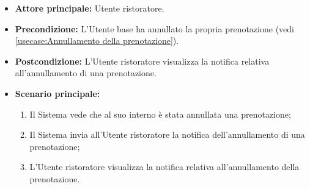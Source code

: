 \label{usecase:Visualizzazione notifica annullamento prenotazione}
\begin{itemize}
	\item \textbf{Attore principale:} Utente ristoratore.

	\item \textbf{Precondizione:} L'Utente base ha annullato la propria prenotazione (vedi \autoref{usecase:Annullamento della prenotazione}).

	\item \textbf{Postcondizione:} L'Utente ristoratore visualizza la notifica relativa all'annullamento di una prenotazione.

	\item \textbf{Scenario principale:}
	      \begin{enumerate}
		      \item Il Sistema vede che al suo interno è stata annullata una prenotazione;
		      \item Il Sistema invia all'Utente ristoratore la notifica dell'annullamento di una prenotazione;
		      \item L'Utente ristoratore visualizza la notifica relativa all'annullamento della prenotazione.
	      \end{enumerate}
\end{itemize}
